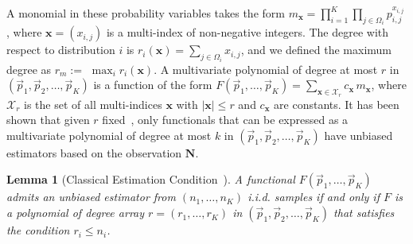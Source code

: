 \documentclass[aps,%
twocolumn,%
floatfix,%
pra,%
amsfonts,%
groupedaddress,%
superscriptaddress]{revtex4-2}%
\newtheorem{lemma}{Lemma}
\newcommand{\1}{\mathbbm{1}}
\begin{document}
A monomial in these probability variables takes the form $m_{\mathbf{x}} = \prod_{i=1}^K \prod_{j \in \Omega_i} p_{i,j}^{x_{i,j}}$, where $\mathbf{x} = (x_{i,j})$ is a multi-index of non-negative integers. The degree with respect to distribution $i$ is $r_i(\mathbf{x}) = \sum_{j \in \Omega_i} x_{i,j}$, and we defined the maximum degree as $r_{m}:=$ $\max_{i} r_i(\mathbf{x})$.
A multivariate polynomial of degree at most $r$ in $(\vec{p}_1, \vec{p}_2, \dots, \vec{p}_K)$ is a function of the form $F(\vec{p}_1, \ldots, \vec{p}_K) = \sum_{\mathbf{x} \in \mathcal{X}_r} c_{\mathbf{x}}\, m_{\mathbf{x}}$, where $\mathcal{X}_r$ is the set of all multi-indices $\mathbf{x}$ with $|\mathbf{x}| \leq r$ and $c_{\mathbf{x}}$ are constants.
It has been shown that given $r$ fixed~\cite{wu2020polynomial}, only functionals that can be expressed as a multivariate polynomial of degree at most $k$ in $(\vec{p}_1, \vec{p}_2, \dots, \vec{p}_K)$ have unbiased estimators based on the observation $\boldsymbol{N}$.


\begin{lemma}[Classical Estimation Condition~\cite{wu2020polynomial}]
A functional $F(\vec{p}_1, \ldots, \vec{p}_K)$ admits an unbiased estimator from $(n_1, \ldots, n_K)$ i.i.d. samples if and only if $F$ is a polynomial of degree array $r = (r_1, \ldots, r_K)$ in $(\vec{p}_1, \vec{p}_2, \dots, \vec{p}_K)$ that satisfies the condition $r_i \leq n_i$.
\end{lemma}
\end{document}
